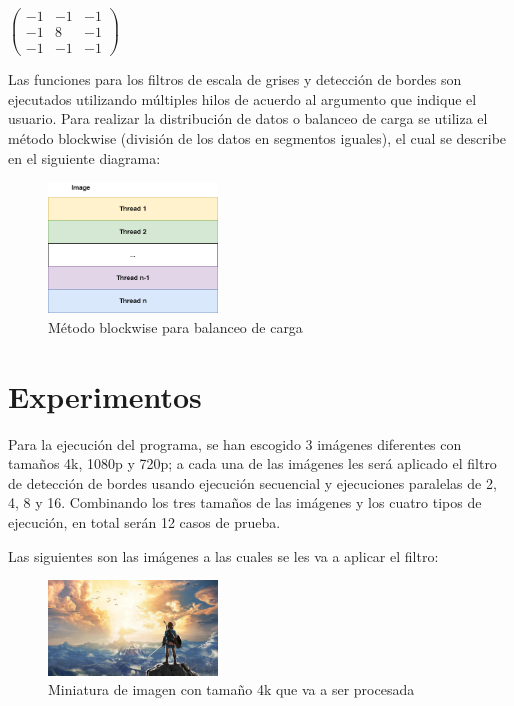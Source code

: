 \begin{itemize}
    \vspace{6mm}
    \begin{center}
        $\begin{pmatrix}
            -1 & -1 & -1\\
            -1 & 8 & -1\\
            -1 & -1 & -1
        \end{pmatrix}$
    \end{center}
    \newpage
    Las funciones para los filtros de escala de grises y detección de bordes son ejecutados utilizando múltiples hilos de acuerdo al argumento que indique el usuario. Para realizar la distribución de datos o balanceo de carga se utiliza el método blockwise (división de los datos en segmentos iguales), el cual se describe en el siguiente diagrama:
    \begin{figure}[H]
        \centering
        \includegraphics[width=0.4\textwidth]{../plots/load_balancing.drawio.png}
        \caption{Método blockwise para balanceo de carga}
    \end{figure}
\end{itemize}

\section{Experimentos}

Para la ejecución del programa, se han escogido 3 imágenes diferentes con tamaños 4k, 1080p y 720p; a cada una de las imágenes les será aplicado el filtro de detección de bordes usando ejecución secuencial y ejecuciones paralelas de 2, 4, 8 y 16. Combinando los tres tamaños de las imágenes y los cuatro tipos de ejecución, en total serán 12 casos de prueba.

Las siguientes son las imágenes a las cuales se les va a aplicar el filtro:

\begin{figure}[H]
    \centering
    \includegraphics[width=0.4\textwidth]{../plots/4k.jpg}
    \caption{Miniatura de imagen con tamaño 4k que va a ser procesada}
\end{figure}

